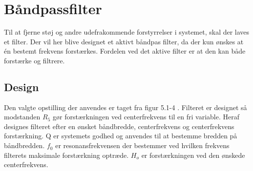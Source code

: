 \section{Båndpassfilter}\label{sec:filter}
Til at fjerne støj og andre udefrakommende forstyrrelser i systemet, skal der laves et filter.
Der vil her blive designet et aktivt båndpas filter, da der kun ønskes at én bestemt frekvens forstærkes.
Fordelen ved det aktive filter er at den kan både forstærke og filtrere.

\subsection{Design}
Den valgte opstilling der anvendes er taget fra figur 5.1-4 \cite[side. 208]{Huelsman1993}.
Filteret er designet så modstanden $R_5$ gør forstærkningen ved centerfrekvens til en fri variable.
Heraf designes filteret efter en ønsket båndbredde, centerfrekvens og centerfrekvens forstærkning. Q er systemets godhed og anvendes til at bestemme bredden på båndbredden. 
$f_0$ er resonansfrekvensen der bestemmer ved hvilken frekvens filterets maksimale forstærkning optræde.
$H_o$ er forstærkningen ved den ønskede centerfrekvens.
